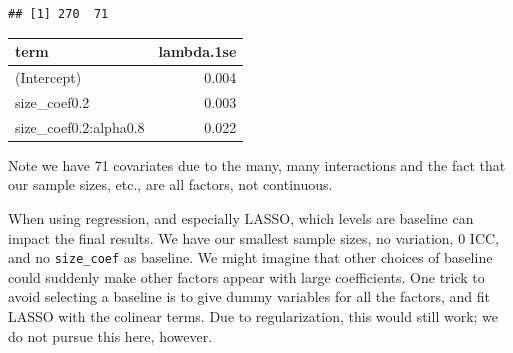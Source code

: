 \documentclass[
]{book}
\newenvironment{Shaded}{\begin{snugshade}}{\end{snugshade}}
\newcommand{\AttributeTok}[1]{\textcolor[rgb]{0.13,0.29,0.53}{#1}}
\newcommand{\CommentTok}[1]{\textcolor[rgb]{0.56,0.35,0.01}{\textit{#1}}}
\newcommand{\DecValTok}[1]{\textcolor[rgb]{0.00,0.00,0.81}{#1}}
\newcommand{\FloatTok}[1]{\textcolor[rgb]{0.00,0.00,0.81}{#1}}
\newcommand{\FunctionTok}[1]{\textcolor[rgb]{0.13,0.29,0.53}{\textbf{#1}}}
\newcommand{\NormalTok}[1]{#1}
\newcommand{\OtherTok}[1]{\textcolor[rgb]{0.56,0.35,0.01}{#1}}
\newcommand{\SpecialCharTok}[1]{\textcolor[rgb]{0.81,0.36,0.00}{\textbf{#1}}}
\newcommand{\StringTok}[1]{\textcolor[rgb]{0.31,0.60,0.02}{#1}}
\begin{document}
\begin{verbatim}
## [1] 270  71
\end{verbatim}

\begin{Shaded}
\end{Shaded}

\begin{tabular}{l|r}
\hline
term & lambda.1se\\
\hline
(Intercept) & 0.004\\
\hline
size\_coef0.2 & 0.003\\
\hline
size\_coef0.2:alpha0.8 & 0.022\\
\hline
\end{tabular}

Note we have 71 covariates due to the many, many interactions and the fact that our sample sizes, etc., are all factors, not continuous.

When using regression, and especially LASSO, which levels are baseline can impact the final results.
We have our smallest sample sizes, no variation, 0 ICC, and no \texttt{size\_coef} as baseline.
We might imagine that other choices of baseline could suddenly make other factors appear with large coefficients.
One trick to avoid selecting a baseline is to give dummy variables for all the factors, and fit LASSO with the colinear terms.
Due to regularization, this would still work; we do not pursue this here, however.
\end{document}
